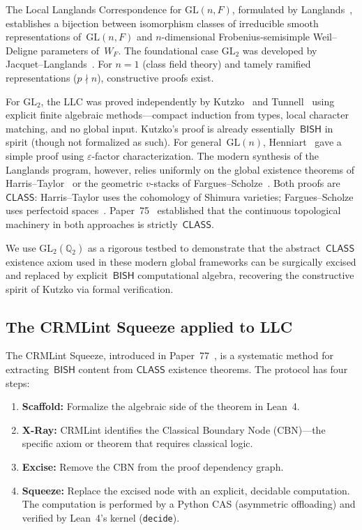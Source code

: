 \documentclass[11pt]{article}
\theoremstyle{plain}
\theoremstyle{definition}
\theoremstyle{remark}
\newcommand{\Q}{\mathbb{Q}}
\newcommand{\GL}{\mathrm{GL}}
\newcommand{\BISH}{\mathsf{BISH}}
\newcommand{\CLASS}{\mathsf{CLASS}}
\begin{document}
The Local Langlands Correspondence for $\GL(n, F)$, formulated
by Langlands~\cite{Langlands1970}, establishes a
bijection between isomorphism classes of irreducible smooth
representations of~$\GL(n, F)$ and $n$-dimensional
Frobenius-semisimple Weil--Deligne parameters of~$W_F$.
The foundational case $\GL_2$ was developed by
Jacquet--Langlands~\cite{JacquetLanglands1970}.
For $n = 1$ (class field theory) and tamely ramified
representations ($p \nmid n$), constructive proofs exist.

For $\GL_2$, the LLC was proved independently by
Kutzko~\cite{Kutzko1980} and Tunnell~\cite{Tunnell1978}
using explicit finite algebraic methods---compact induction
from types, local character matching, and no global input.
Kutzko's proof is already essentially~$\BISH$ in spirit
(though not formalized as such).  For general~$\GL(n)$,
Henniart~\cite{Henniart2000} gave a simple proof using
$\varepsilon$-factor characterization.  The modern synthesis
of the Langlands program, however, relies uniformly on the
global existence theorems of
Harris--Taylor~\cite{HarrisTaylor2001} or the geometric
$v$-stacks of Fargues--Scholze~\cite{FarguesScholze2024}.
Both proofs are~$\CLASS$: Harris--Taylor uses the cohomology
of Shimura varieties; Fargues--Scholze uses perfectoid
spaces~\cite{Scholze2018}.
Paper~75~\cite{Paper75} established that the continuous
topological machinery in both approaches is strictly~$\CLASS$.

We use $\GL_2(\Q_2)$ as a rigorous testbed to demonstrate
that the abstract~$\CLASS$ existence axiom used in these
modern global frameworks can be surgically excised and
replaced by explicit~$\BISH$ computational algebra, recovering
the constructive spirit of Kutzko via formal verification.

\subsection{The CRMLint Squeeze applied to LLC}

The CRMLint Squeeze, introduced in Paper~77~\cite{Paper77},
is a systematic method for extracting~$\BISH$ content from
$\CLASS$ existence theorems.  The protocol has four steps:
\begin{enumerate}[nosep]
\item \textbf{Scaffold:} Formalize the algebraic side of the
  theorem in Lean~4.
\item \textbf{X-Ray:} CRMLint identifies the Classical Boundary
  Node (CBN)---the specific axiom or theorem that requires
  classical logic.
\item \textbf{Excise:} Remove the CBN from the proof
  dependency graph.
\item \textbf{Squeeze:} Replace the excised node with an
  explicit, decidable computation.  The computation is performed
  by a Python CAS (asymmetric offloading) and verified by
  Lean~4's kernel (\texttt{decide}).
\end{enumerate}
\end{document}
